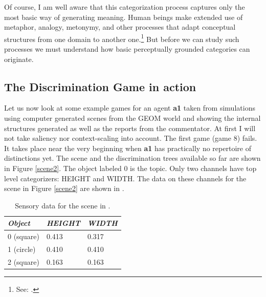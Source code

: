 Of course, I am well aware that this categorization 
process captures only the most basic way of generating
meaning. Human beings make extended use of metaphor, 
analogy, metonymy, and other processes that adapt 
conceptual structures from one domain to another one.\footnote{
See: \cite{Johnson:1987}.}
But before we can study such processes we must understand
how basic perceptually grounded categories can 
originate. 
 
\subsection{The Discrimination Game in action}

Let us now look at some example 
games for an agent {\bf a1} taken from simulations
using computer generated
scenes from the GEOM world and showing the internal
structures generated as well as the reports from the commentator. 
At first I will not take saliency nor 
context-scaling into account. The first game
(game 8) fails. It takes place near the very beginning 
when {\bf a1} has practically 
no repertoire of distinctions yet. The scene and the 
discrimination trees available so far are shown in Figure 
\ref{scene2}. The object labeled 0 is the
topic. Only two channels have top level
categorizers: HEIGHT and WIDTH. 
The data on these channels for the scene in Figure
\ref{scene2} are shown in . 
\begin{table}
\begin{center}
\begin{tabular}{| l | l | l |} \hline
{\it Object} & {\it HEIGHT} & {\it WIDTH} \\ \hline
0 (square) & 0.413 & 0.317  \\ \hline
1 (circle) & 0.410 & 0.410 \\ \hline
2 (square) & 0.163 & 0.163 \\ \hline
\end{tabular}
\caption{\label{tab:t-game8} Sensory data for the scene in .}
\end{center}
\end{table}

